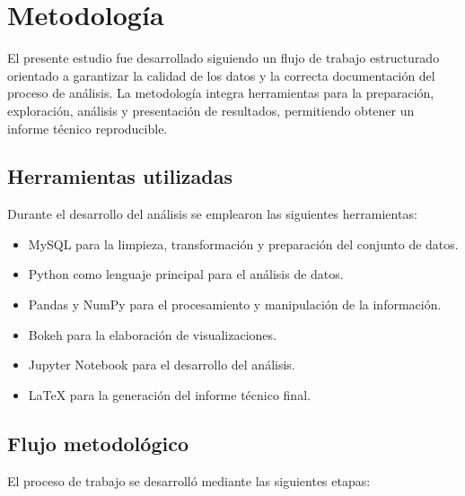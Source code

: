 \chapter{Metodología}

El presente estudio fue desarrollado siguiendo un flujo de trabajo estructurado orientado a garantizar la calidad de los datos y la correcta documentación del proceso de análisis. La metodología integra herramientas para la preparación, exploración, análisis y presentación de resultados, permitiendo obtener un informe técnico reproducible.

\section{Herramientas utilizadas}

Durante el desarrollo del análisis se emplearon las siguientes herramientas:

\begin{itemize}

\item MySQL para la limpieza, transformación y preparación del conjunto de datos.

\item Python como lenguaje principal para el análisis de datos.

\item Pandas y NumPy para el procesamiento y manipulación de la información.

\item Bokeh para la elaboración de visualizaciones.

\item Jupyter Notebook para el desarrollo del análisis.

\item \LaTeX{} para la generación del informe técnico final.

\end{itemize}

\section{Flujo metodológico}

El proceso de trabajo se desarrolló mediante las siguientes etapas:

